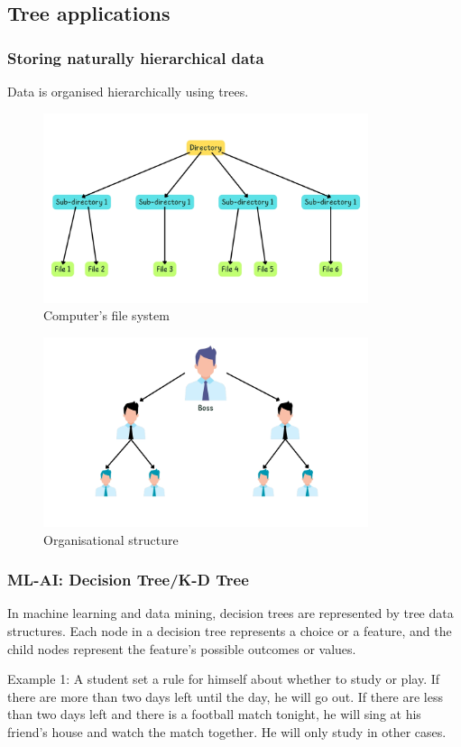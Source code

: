 \subsection{Tree applications}
\subsubsection{Storing naturally hierarchical data}
Data is organised hierarchically using trees.
\begin{figure}[H]
		\centering
		\includegraphics[width=0.85\textwidth]{figures/tree-app-1}
		\caption{Computer's file system}
		\label{fig:tree-app-1}
\end{figure}
\begin{figure}[H]
	\centering
	\includegraphics[width=0.85\textwidth]{figures/tree-app-2}
	\caption{Organisational structure}
	\label{tree-app-2}
\end{figure}
\subsubsection{ML-AI: Decision Tree/K-D Tree}
\begin{tcolorbox}[title=Decision trees,coltitle =black,fonttitle=\large\bfseries,colback=green!5!white,colframe=green!75!black]
In machine learning and data mining, decision trees are represented by tree data structures. Each node in a decision tree represents a choice or a feature, and the child nodes represent the feature's possible outcomes or values.
\end{tcolorbox}
{\large Example 1:} A student set a rule for himself about whether to study or play. If there are more than two days left until the day, he will go out. If there are less than two days left and there is a football match tonight, he will sing at his friend's house and watch the match together. He will only study in other cases.\\

